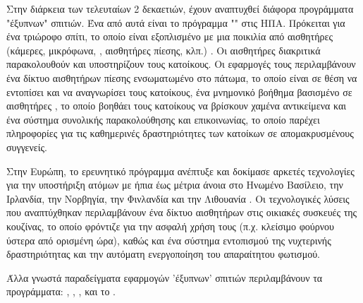 \par
Στην διάρκεια των τελευταίων 2 δεκαετιών, έχουν αναπτυχθεί διάφορα προγράμματα "έξυπνων" σπιτιών.
Ένα από αυτά είναι το πρόγραμμα "" στις ΗΠΑ. Πρόκειται για ένα τριώροφο σπίτι, το οποίο είναι εξοπλισμένο με μια ποικιλία από αισθητήρες (κάμερες, μικρόφωνα, , αισθητήρες πίεσης,  κλπ.) \cite{aware_home}.
Οι αισθητήρες διακριτικά παρακολουθούν και υποστηρίζουν τους κατοίκους.
Οι εφαρμογές τους περιλαμβάνουν ένα δίκτυο αισθητήρων πίεσης ενσωματωμένο στο πάτωμα, το οποίο είναι σε θέση να εντοπίσει και να αναγνωρίσει τους κατοίκους, ένα μνημονικό βοήθημα βασισμένο σε αισθητήρες , το οποίο βοηθάει τους κατοίκους να βρίσκουν χαμένα αντικείμενα και ένα σύστημα συνολικής παρακολούθησης και επικοινωνίας, το οποίο παρέχει πληροφορίες για τις καθημερινές δραστηριότητες των κατοίκων σε απομακρυσμένους συγγενείς.
\par
Στην Ευρώπη, το ερευνητικό πρόγραμμα  ανέπτυξε και δοκίμασε αρκετές τεχνολογίες για την υποστήριξη ατόμων με ήπια έως μέτρια άνοια στο Ηνωμένο Βασίλειο, την Ιρλανδία, την Νορβηγία, την Φινλανδία και την Λιθουανία \cite{Adlam2004}\cite{Cahill2007}.
Οι τεχνολογικές λύσεις που αναπτύχθηκαν περιλαμβάνουν ένα δίκτυο αισθητήρων στις οικιακές συσκευές της κουζίνας, το οποίο φρόντιζε για την ασφαλή χρήση τους (π.χ. κλείσιμο φούρνου ύστερα από ορισμένη ώρα), καθώς και ένα σύστημα εντοπισμού της νυχτερινής δραστηριότητας και την αυτόματη ενεργοποίηση του απαραίτητου φωτισμού. 
\par
Άλλα γνωστά παραδείγματα εφαρμογών 'έξυπνων' σπιτιών περιλαμβάνουν τα προγράμματα:  \cite{Cook2013},  \cite{Das2004},  \cite{yamazaki2007},  \cite{Orpwood2004} και το  \cite{Klack2011}.

